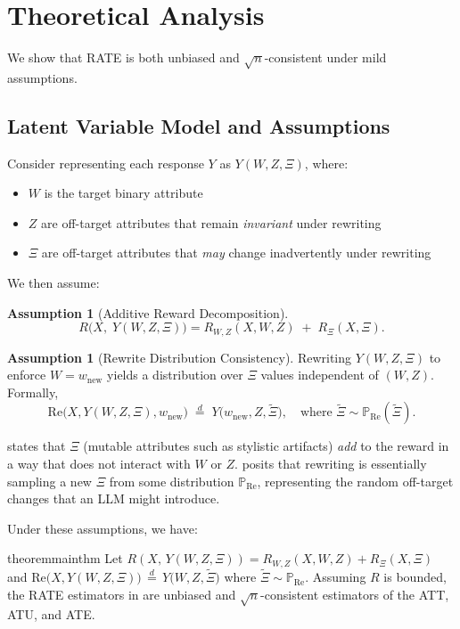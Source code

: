 \documentclass{article}
\theoremstyle{definition}
\newtheorem{assumption}[theorem]{Assumption}
\begin{document}
\section{Theoretical Analysis}
\label{sec:theory}

We show that RATE is both unbiased and $\sqrt{n}$-consistent under mild assumptions.

\subsection{Latent Variable Model and Assumptions}

Consider representing each response $Y$ as $Y(W, Z, \Xi)$, where:
\begin{itemize}
    \item $W$ is the target binary attribute
    \item $Z$ are off-target attributes that remain \emph{invariant} under rewriting
    \item $\Xi$ are off-target attributes that \emph{may} change inadvertently under rewriting
\end{itemize}

We then assume:

\begin{assumption}[Additive Reward Decomposition]
\label{assump:additive}
\[
R\bigl(X,\;Y(W,Z,\Xi)\bigr) = R_{W,Z}(X,W,Z) \;+\; R_{\Xi}(X,\Xi).
\]
\end{assumption}

\begin{assumption}[Rewrite Distribution Consistency]
\label{assump:rewrite_dist}
Rewriting $Y(W,Z,\Xi)$ to enforce $W=w_{\text{new}}$ yields a distribution over $\Xi$ values independent of $(W,Z)$. Formally,
\[
\text{Re}\bigl(X, Y(W,Z,\Xi), w_{\text{new}} \bigr) \;\stackrel{d}{=}\; Y\bigl(w_{\text{new}},Z,\widetilde{\Xi}\bigr),
\quad\text{where } \widetilde{\Xi} \sim \mathbb{P}_{\mathrm{Re}}(\widetilde{\Xi}).
\]
\end{assumption}
\noindent
{} states that $\Xi$ (mutable attributes such as stylistic artifacts) \emph{add} to the reward in a way that does not interact with $W$ or $Z$.  posits that rewriting is essentially sampling a new $\Xi$ from some distribution $\mathbb{P}_{\mathrm{Re}}$, representing the random off-target changes that an LLM might introduce.

Under these assumptions, we have:

\begin{restatable}{theorem}{mainthm}
\label{thm:mainthm}
Let $R(X,\,Y(W,Z,\Xi)) = R_{W,Z}(X,W,Z) + R_{\Xi}(X,\Xi)$ and
\(
\text{Re}\bigl(X, Y(W,Z,\Xi)\bigr) \,\stackrel{d}{=}\, Y\bigl(W,Z,\tilde{\Xi}\bigr)
\)
where
\(
\tilde{\Xi} \sim \mathbb{P}_{\mathrm{Re}}
\).
Assuming $R$ is bounded, the RATE estimators in  are unbiased and $\sqrt{n}$-consistent estimators of the ATT, ATU, and ATE.
\end{restatable}
\end{document}
